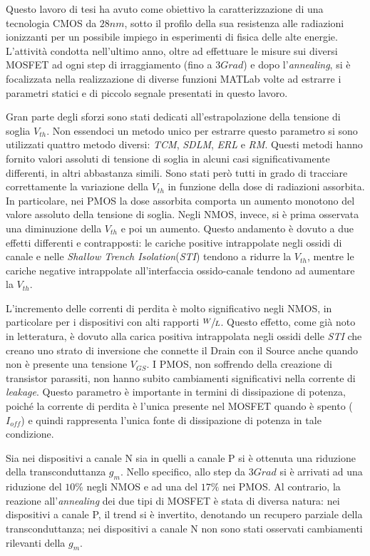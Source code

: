 Questo lavoro di tesi ha avuto come obiettivo la caratterizzazione di una tecnologia CMOS da $28nm$, sotto il profilo della sua resistenza alle radiazioni ionizzanti per un possibile impiego in esperimenti di fisica delle alte energie. L'attività condotta nell'ultimo anno, oltre ad effettuare le misure sui diversi MOSFET ad ogni step di irraggiamento (fino a $3Grad$) e dopo l'\textit{annealing}, si è focalizzata nella realizzazione di diverse funzioni MATLab volte ad estrarre i parametri statici e di piccolo segnale presentati in questo lavoro.

\vspace{0.5cm}

Gran parte degli sforzi sono stati dedicati all'estrapolazione della tensione di soglia $V_{th}$. Non essendoci un metodo unico per estrarre questo parametro si sono utilizzati quattro metodo diversi: \textit{TCM}, \textit{SDLM}, \textit{ERL} e \textit{RM}. Questi metodi hanno fornito valori assoluti di tensione di soglia in alcuni casi significativamente differenti, in altri abbastanza simili. Sono stati però tutti in grado di tracciare correttamente la variazione della $V_{th}$ in funzione della dose di radiazioni assorbita. In particolare, nei PMOS la dose assorbita comporta un aumento monotono del valore assoluto della tensione di soglia. Negli NMOS, invece, si è prima osservata una diminuzione della $V_{th}$ e poi un aumento. Questo andamento è dovuto a due effetti differenti e contrapposti: le cariche positive intrappolate negli ossidi di canale e nelle \emph{Shallow Trench Isolation}(\emph{STI}) tendono a ridurre la $V_{th}$, mentre le cariche negative intrappolate all'interfaccia ossido-canale tendono ad aumentare la $V_{th}$.

L'incremento delle correnti di perdita è molto significativo negli NMOS, in particolare per i dispositivi con alti rapporti $\sfrac{W}{L}$. Questo effetto, come già noto in letteratura, è dovuto alla carica positiva intrappolata negli ossidi delle \emph{STI} che creano uno strato di inversione che connette il Drain con il Source anche quando non è presente una tensione $V_{GS}$. I PMOS, non soffrendo della creazione di transistor parassiti, non hanno subito cambiamenti significativi nella corrente di \emph{leakage}. Questo parametro è importante in termini di dissipazione di potenza, poiché la corrente di perdita è l'unica presente nel MOSFET quando è spento ($I_{off}$) e quindi rappresenta l'unica fonte di dissipazione di potenza in tale condizione.   

Sia nei dispositivi a canale N sia in quelli a canale P si è ottenuta una riduzione della transconduttanza $g_m$. Nello specifico, allo step da $3Grad$ si è arrivati ad una riduzione del $10\%$ negli NMOS e ad una del $17\%$ nei PMOS. Al contrario, la reazione all'\textit{annealing} dei due tipi di MOSFET è stata di diversa natura: nei dispositivi a canale P, il trend si è invertito, denotando un recupero parziale della transconduttanza; nei dispositivi a canale N non sono stati osservati cambiamenti rilevanti della $g_m$.    

   